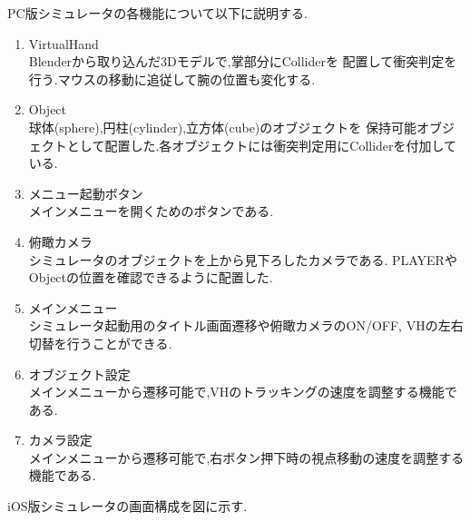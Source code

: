 \documentclass{ltjsreport}
\begin{document}
		PC版シミュレータの各機能について以下に説明する.
		\begin{enumerate}
			\renewcommand{\labelenumi}{\textcircled{\scriptsize \theenumi}}
			\item VirtualHand\\
				Blenderから取り込んだ3Dモデルで,掌部分にColliderを
				配置して衝突判定を行う.マウスの移動に追従して腕の位置も変化する.
			\item Object\\
				球体(sphere),円柱(cylinder),立方体(cube)のオブジェクトを
				保持可能オブジェクトとして配置した.各オブジェクトには衝突判定用にColliderを付加している.
			\item メニュー起動ボタン\\
				メインメニューを開くためのボタンである.
			\item 俯瞰カメラ\\
				シミュレータのオブジェクトを上から見下ろしたカメラである.
				PLAYERやObjectの位置を確認できるように配置した.
			\item メインメニュー\\
				シミュレータ起動用のタイトル画面遷移や俯瞰カメラのON/OFF,
				VHの左右切替を行うことができる.
\clearpage
			\item オブジェクト設定\\
				メインメニューから遷移可能で,VHのトラッキングの速度を調整する機能である.
			\item カメラ設定\\
				メインメニューから遷移可能で,右ボタン押下時の視点移動の速度を調整する機能である.
		\end{enumerate}

		iOS版シミュレータの画面構成を図に示す.
\end{document}
